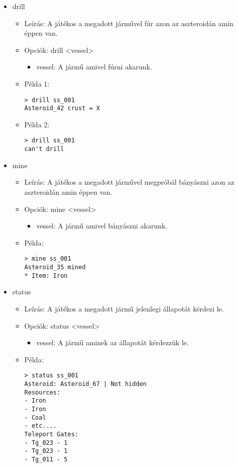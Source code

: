 \documentclass[../../projlab]{subfiles}
\begin{document}
\begin{itemize}
    \item drill
    \begin{itemize}
        \item Leírás: A játékos a megadott járművel fúr azon az aszteroidán amin éppen van.
        \item Opciók: drill <vessel>
        \begin{itemize}
            \item vessel: A jármű amivel fúrni akarunk.
        \end{itemize}
        \item Példa 1:
            \begin{verbatim}
> drill ss_001 
Asteroid_42 crust = X
            \end{verbatim}
        \item Példa 2:
            \begin{verbatim}
> drill ss_001 
can't drill
            \end{verbatim}
    \end{itemize}


    \item mine
    \begin{itemize}
        \item Leírás: A játékos a megadott járművel megpróbál bányászni azon az aszteroidán amin éppen van.
        \item Opciók: mine <vessel>
        \begin{itemize}
            \item vessel: A jármű amivel bányászni akarunk.
        \end{itemize}
        \item Példa:
            \begin{verbatim}
> mine ss_001
Asteroid_35 mined
* Item: Iron
            \end{verbatim}
    \end{itemize}


    \item status
    \begin{itemize}
        \item Leírás: A játékos a megadott jármű jelenlegi állapotát kérdezi le.
        \item Opciók: status <vessel>
        \begin{itemize}
            \item vessel: A jármű aminek az állapotát kérdezzük le.
        \end{itemize}
        \item Példa:
            \begin{verbatim}
> status ss_001
Asteroid: Asteroid_67 | Not hidden
Resources:
- Iron
- Iron
- Coal
- etc....
Teleport Gates:
- Tg_023 - 1
- Tg_023 - 1
- Tg_011 - 5
            \end{verbatim}
    \end{itemize}



\end{itemize}
\end{document}
